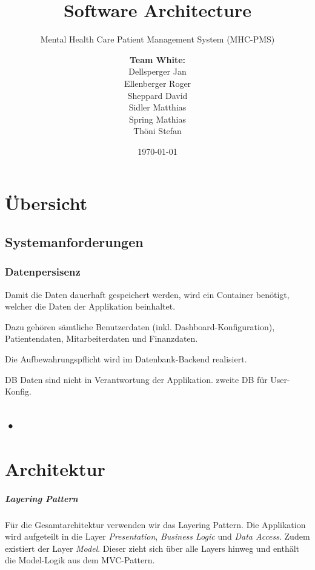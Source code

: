 \documentclass[a4paper]{scrreprt}
\title{Software Architecture}
\subtitle{Mental Health Care Patient Management System (MHC-PMS)}
\author{
\begin{tabular}{l}
\normalfont\bfseries{Team White:}\\
Dellsperger Jan\\
Ellenberger Roger\\
Sheppard David\\
Sidler Matthias\\
Spring Mathias\\
Thöni Stefan
\end{tabular}
}
\date{\today}
\begin{document}
\begin{titlepage}
	\maketitle
\end{titlepage}



\chapter{Übersicht}

\section{Systemanforderungen}

\subsection{Datenpersisenz}
Damit die Daten dauerhaft gespeichert werden, wird ein Container benötigt, welcher die Daten der Applikation beinhaltet. 

Dazu gehören sämtliche Benutzerdaten (inkl. Dashboard-Konfiguration), Patientendaten, Mitarbeiterdaten und Finanzdaten.


Die Aufbewahrungspflicht wird im Datenbank-Backend realisiert.



DB Daten sind nicht in Verantwortung der Applikation. zweite DB für User-Konfig.	


\section{•}






\chapter{Architektur}
\paragraph{Layering Pattern}
Für die Gesamtarchitektur verwenden wir das Layering Pattern. Die Applikation wird aufgeteilt in die Layer \textit{Presentation}, \textit{Business Logic} und \textit{Data Access}. Zudem existiert der Layer \textit{Model}. Dieser zieht sich über alle Layers hinweg und enthält die Model-Logik aus dem MVC-Pattern.
\end{document}
